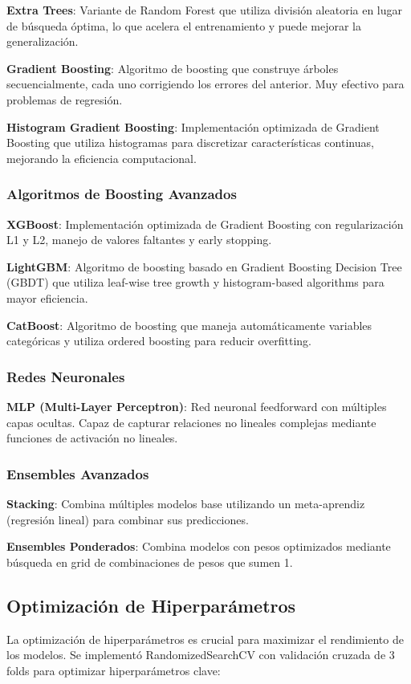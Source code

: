 \documentclass[conference]{IEEEtran}
\begin{document}
	\textbf{Extra Trees}: Variante de Random Forest que utiliza división aleatoria en lugar de búsqueda óptima, lo que acelera el entrenamiento y puede mejorar la generalización.
	
	\textbf{Gradient Boosting}: Algoritmo de boosting que construye árboles secuencialmente, cada uno corrigiendo los errores del anterior. Muy efectivo para problemas de regresión.
	
	\textbf{Histogram Gradient Boosting}: Implementación optimizada de Gradient Boosting que utiliza histogramas para discretizar características continuas, mejorando la eficiencia computacional.
	
	\subsubsection{Algoritmos de Boosting Avanzados}
	\textbf{XGBoost}: Implementación optimizada de Gradient Boosting con regularización L1 y L2, manejo de valores faltantes y early stopping.
	
	\textbf{LightGBM}: Algoritmo de boosting basado en Gradient Boosting Decision Tree (GBDT) que utiliza leaf-wise tree growth y histogram-based algorithms para mayor eficiencia.
	
	\textbf{CatBoost}: Algoritmo de boosting que maneja automáticamente variables categóricas y utiliza ordered boosting para reducir overfitting.
	
	\subsubsection{Redes Neuronales}
	\textbf{MLP (Multi-Layer Perceptron)}: Red neuronal feedforward con múltiples capas ocultas. Capaz de capturar relaciones no lineales complejas mediante funciones de activación no lineales.
	
	\subsubsection{Ensembles Avanzados}
	\textbf{Stacking}: Combina múltiples modelos base utilizando un meta-aprendiz (regresión lineal) para combinar sus predicciones.
	
	\textbf{Ensembles Ponderados}: Combina modelos con pesos optimizados mediante búsqueda en grid de combinaciones de pesos que sumen 1.
	
	\subsection{Optimización de Hiperparámetros}
	La optimización de hiperparámetros es crucial para maximizar el rendimiento de los modelos. Se implementó RandomizedSearchCV con validación cruzada de 3 folds para optimizar hiperparámetros clave:
	
\end{document}
